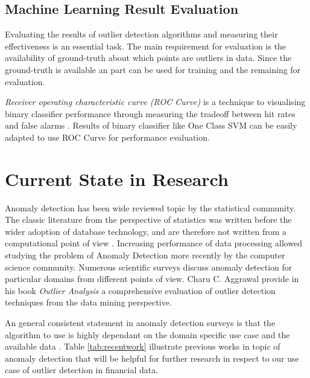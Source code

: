 \subsection{Machine Learning Result Evaluation}

Evaluating the results of outlier detection algorithms and measuring their effectiveness is an essential task. The main requirement for evaluation is the availability of ground-truth about which points are outliers in data. Since the ground-truth is available an part can be used for training and the remaining for evaluation. 

\textit{Receiver operating characteristic curve (ROC Curve) } is a technique to visualising binary classifier performance through measuring the tradeoff between hit rates and false alarms \cite{Fawcett:2006:IRA:1159473.1159475}. Results of binary classifier like One Class SVM can be easily adapted to use ROC Curve for performance evaluation. %

\section{Current State in Research}

Anomaly detection has been wide reviewed topic by the statistical community. The classic literature from the perspective of statistics \cite{Hawkins:1980,Barnett:1978} was written before the wider adoption of database technology, and are therefore not written from a computational point of view \cite{Aggarwal:2013}.
Increasing performance of data processing allowed studying the problem of Anomaly Detection more recently by the computer science community. Numerous scientific surveys \cite{Agyemang:2006:CSN:1609942.1609946,Chandola:2009:ADS:1541880.1541882,Chandola:2012:ADD:2197072.2197116,Pimentel:2014:RRN:2588908.2589196} discuss anomaly detection for particular domains from different points of view. Charu C. Aggrawal provide in his book \textit{Outlier Analysis} \cite{Aggarwal:2013} a comprehensive evaluation of outlier detection techniques from the data mining perspective. 

An general consistent statement in anomaly detection surveys is that the algorithm to use is highly dependant on the domain specific use case and the available data \cite{Agyemang:2006:CSN:1609942.1609946,Chandola:2009:ADS:1541880.1541882,Chandola:2012:ADD:2197072.2197116,Pimentel:2014:RRN:2588908.2589196}. Table \ref{tab:recentwork} illustrate previous works in topic of anomaly detection that will be helpful for further research in respect to our use case of outlier detection in financial data.


